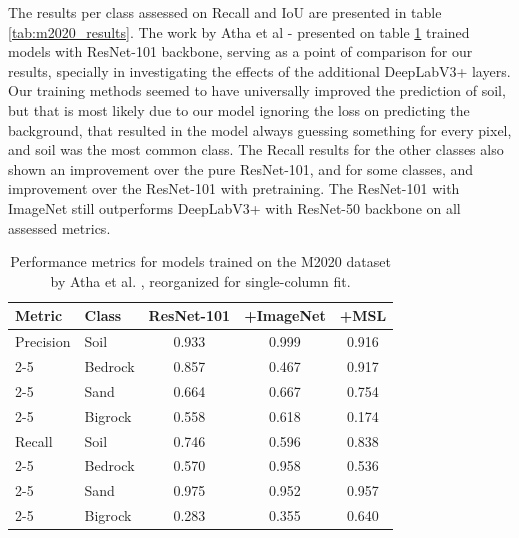 \documentclass[10pt, conference]{IEEEtran}
\begin{document}
The results per class assessed on Recall and IoU are presented in table \ref{tab:m2020_results}.
The work by Atha et al \cite{Atha2022} - presented on table \ref{tab:m2020_atha} trained models with ResNet-101 backbone, serving as a point of comparison for our results, specially in investigating the effects of the
additional DeepLabV3+ layers. Our training methods seemed to have universally improved
the prediction of soil, but that is most likely due to our model ignoring the loss on
predicting the background, that resulted in the model always guessing something for every pixel,
and soil was the most common class. The Recall results for the other classes also
shown an improvement over the pure ResNet-101, and for some classes, and improvement over the
ResNet-101 with pretraining.
The ResNet-101 with ImageNet still outperforms DeepLabV3+ with ResNet-50 backbone on all assessed metrics.


\begin{table}[h]
  \centering
  \begin{tabular}{|l|l|c|c|c|}
    \hline
    \textbf{Metric} & \textbf{Class} & \textbf{ResNet-101} & \textbf{+ImageNet} & \textbf{+MSL} \\ \hline
    \hline
    Precision & Soil    & 0.933 & 0.999 & 0.916 \\ \cline{2-5}
                    & Bedrock & 0.857 & 0.467 & 0.917 \\ \cline{2-5}
                    & Sand    & 0.664 & 0.667 & 0.754 \\ \cline{2-5}
                    & Bigrock & 0.558 & 0.618 & 0.174 \\ \hline
    \hline
    Recall    & Soil    & 0.746 & 0.596 & 0.838 \\ \cline{2-5}
                    & Bedrock & 0.570 & 0.958 & 0.536 \\ \cline{2-5}
                    & Sand    & 0.975 & 0.952 & 0.957 \\ \cline{2-5}
                    & Bigrock & 0.283 & 0.355 & 0.640 \\ \hline
  \end{tabular}
  \caption{Performance metrics for models trained on the M2020 dataset by Atha et al. \cite{Atha2022}, reorganized for single-column fit.}
  \label{tab:m2020_atha}
\end{table}
\end{document}
